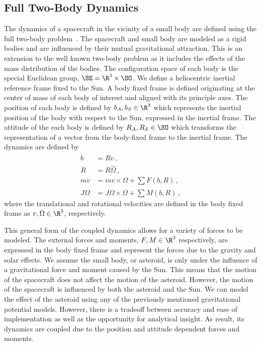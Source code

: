 \documentclass[11pt,draft]{article} %
\begin{document}
\subsection{Full Two-Body Dynamics}
The dynamics of a spacecraft in the vicinity of a small body are defined using the full two-body problem~\cite{fahnestock2006}.
The spacecraft and small body are modeled as a rigid bodies and are influenced by their mutual gravitational attraction.
This is an extension to the well known two-body problem as it includes the effects of the mass distribution of the bodies.
The configuration space of each body is the special Euclidean group, \( \SE = \R^3 \times \SO \). 
We define a heliocentric inertial reference frame fixed to the Sun. 
A body fixed frame is defined originating at the center of mass of each body of interest and aligned with its principle axes.
The position of each body is defined by \( b_A, b_S \in \R^3 \) which represents the inertial position of the body with respect to the Sun, expressed in the inertial frame. 
The attitude of the each body is defined by \( R_A, R_S \in \SO\) which transforms the representation of a vector from the body-fixed frame to the inertial frame.
The dynamics are defined by
\begin{align*}
	\dot{b} &= R v \, ,\\
	\dot{R} &= R \hat{\Omega} \, ,\\
	m \dot{v} &= m v \times \Omega + \sum F(b, R) \, ,\\
	J \dot{\Omega}  &= J \Omega \times \Omega +  \sum M(b, R) \, ,
\end{align*}
where the translational and rotational velocities are defined in the body fixed frame as \( v , \Omega \in \R^3 \), respectively.

This general form of the coupled dynamics allows for a variety of forces to be modeled.
The external forces and moments, \( F, M \in \R^3 \) respectively, are expressed in the body fixed frame and represent the forces due to the gravity and solar effects.
We assume the small body, or asteroid, is only under the influence of a gravitational force and moment caused by the Sun.
This means that the motion of the spacecraft does not affect the motion of the asteroid. 
However, the motion of the spacecraft is influenced by both the asteroid and the Sun.
We can model the effect of the asteroid using any of the previously mentioned gravitational potential models. 
However, there is a tradeoff between accuracy and ease of implementation as well as the opportunity for analytical insight. 
As result, its dynamics are coupled due to the position and attitude dependent forces and moments.
\end{document}
